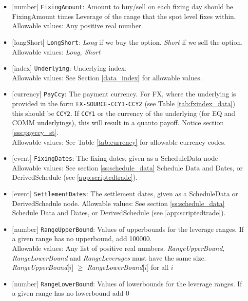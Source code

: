 \begin{itemize}
    \item{}[number] \lstinline!FixingAmount!: Amount to buy/sell on each fixing day should be FixingAmount times Leverage of the range that the spot level fixes within. \\
    Allowable values: Any positive real number.
    \item{}[longShort] \lstinline!LongShort!: \emph{Long} if we buy the option. \emph{Short} if we sell the option.
    Allowable values: \emph{Long, Short}
    \item{}[index] \lstinline!Underlying!: Underlying index. \\
    Allowable values: See Section \ref{data_index} for allowable values.
    \item{}[currency] \lstinline!PayCcy!: The payment currency. For FX, where the underlying is provided
      in the form \lstinline!FX-SOURCE-CCY1-CCY2! (see Table \ref{tab:fxindex_data}) this should
      be \lstinline!CCY2!. If \lstinline!CCY1! or the currency of the underlying (for EQ and
      COMM underlyings), this will result in a quanto payoff. Notice section \ref{sss:payccy_st}. \\
        Allowable values: See Table \ref{tab:currency} for allowable currency codes.
    \item{}[event] \lstinline!FixingDates!: The fixing dates, given as a ScheduleData node \\
    Allowable values: See section \ref{ss:schedule_data} Schedule Data and Dates, or DerivedSchedule (see \ref{app:scriptedtrade}).
    \item{}[event] \lstinline!SettlementDates!: The settlement dates, given as a ScheduleData or DerivedSchedule node.
    Allowable values: See section \ref{ss:schedule_data} Schedule Data and Dates, or DerivedSchedule (see \ref{app:scriptedtrade}).
    \item{}[number] \lstinline!RangeUpperBound!: Values of upperbounds for the leverage ranges. If a given range has no upperbound, add 100000. \\
    Allowable values: Any list of positive real numbers. \emph{RangeUpperBound}, \emph{RangeLowerBound} and \emph{RangeLeverages} must have the same size. \emph{RangeUpperBound}[$i$] $\ge$ \emph{RangeLowerBound}[$i$] for all $i$
    \item{}[number] \lstinline!RangeLowerBound!: Values of lowerbounds for the leverage ranges. If a given range has no lowerbound add 0 \\

\end{itemize}
